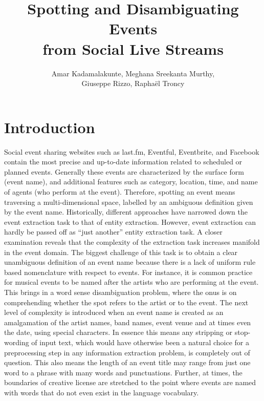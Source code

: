 \documentclass[10pt,a4paper]{article}
\author{Amar Kadamalakunte, Meghana Sreekanta Murthy,\\Giuseppe Rizzo, Rapha\"el Troncy}
\title{Spotting and Disambiguating Events\\from Social Live Streams}
\begin{document}
\maketitle
\section{Introduction}
\label{sec:introduction}
Social event sharing websites such as last.fm, Eventful, Eventbrite, and Facebook contain the most precise and up-to-date information related to scheduled or planned events. 
Generally these events are characterized by the surface form (event name), and additional features such as category, location, time, and name of agents (who perform at the event). Therefore, spotting an event means traversing a multi-dimensional space, labelled by an ambiguous definition given by the event name. 
Historically, different approaches have narrowed down the event extraction task to that of entity extraction. However, event extraction can hardly be passed off as ``just another'' entity extraction task. A closer examination reveals that the complexity of the extraction task increases manifold in the event domain. The biggest challenge of this task is to obtain a clear unambiguous definition of an event name because there is a lack of uniform rule based nomenclature with respect to events. 
For instance, it is common practice for musical events to be named after the artists who are performing at the event. 
This brings in a word sense disambiguation problem, where the onus is on comprehending whether the spot refers to the artist or to the event. The next level of complexity is introduced when an event name is created as an amalgamation of the artist names, band names, event venue and at times even the date, using special characters. %
In essence this means any stripping or stop-wording of input text, which would have otherwise been a natural choice for a preprocessing step in any information extraction problem, is completely out of question. This also means the length of an event title may range from just one word to a phrase with many words and punctuations. Further, at times, the boundaries of creative license are stretched to the point where events are named with words that do not even exist in the language vocabulary. 
\end{document}
